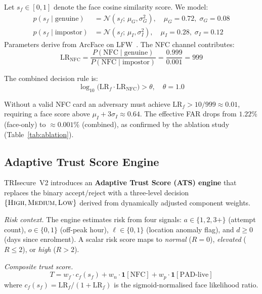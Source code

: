 \documentclass[submission]{sacjsub}
\begin{document}
Let \(s_f \in [0,1]\) denote the face cosine similarity score.
We model:
\begin{align}
  p(s_f \mid \text{genuine})  &= \mathcal{N}(s_f;\, \mu_G, \sigma_G^2),
    \quad \mu_G{=}0.72,\; \sigma_G{=}0.08 \\
  p(s_f \mid \text{impostor}) &= \mathcal{N}(s_f;\, \mu_I, \sigma_I^2),
    \quad \mu_I{=}0.28,\; \sigma_I{=}0.12
\end{align}
Parameters derive from ArcFace on LFW~\cite{deng2019arcface}. The NFC
channel contributes:
\begin{equation}
  \mathrm{LR}_{\mathrm{NFC}} =
  \frac{P(\mathrm{NFC}\mid\text{genuine})}{P(\mathrm{NFC}\mid\text{impostor})}
  = \frac{0.999}{0.001} = 999
\end{equation}

The combined decision rule is:
\begin{equation}
  \log_{10}\!\bigl(\mathrm{LR}_f \cdot \mathrm{LR}_{\mathrm{NFC}}\bigr) >
  \theta, \quad \theta = 1.0
\end{equation}

Without a valid NFC card an adversary must achieve
\(\mathrm{LR}_f > 10/999 \approx 0.01\), requiring a face score above
\(\mu_I + 3\sigma_I \approx 0.64\). The effective FAR drops from
\(1.22\%\) (face-only) to \(\approx 0.001\%\) (combined), as confirmed
by the ablation study (Table~\ref{tab:ablation}).

\subsection{Adaptive Trust Score Engine}\label{sec:ats}

TRIsecure~V2 introduces an \textbf{Adaptive Trust Score (ATS) engine}
that replaces the binary accept/reject with a three-level decision
\(\{\textsc{High}, \textsc{Medium}, \textsc{Low}\}\) derived from
dynamically adjusted component weights.

\textit{Risk context.} The engine estimates risk from four signals:
\(a \in \{1,2,3+\}\) (attempt count), \(o \in \{0,1\}\) (off-peak
hour), \(\ell \in \{0,1\}\) (location anomaly flag), and \(d \geq 0\)
(days since enrolment). A scalar risk score maps to \textit{normal}
(\(R=0\)), \textit{elevated} (\(R \leq 2\)), or \textit{high}
(\(R>2\)).

\textit{Composite trust score.}
\begin{equation}
  T = w_f \cdot c_f(s_f) + w_n \cdot \mathbf{1}[\mathrm{NFC}]
        + w_p \cdot \mathbf{1}[\mathrm{PAD\text{-}live}]
  \label{eq:ats}
\end{equation}
where \(c_f(s_f) = \mathrm{LR}_f/(1+\mathrm{LR}_f)\) is the
sigmoid-normalised face likelihood ratio.
\end{document}

